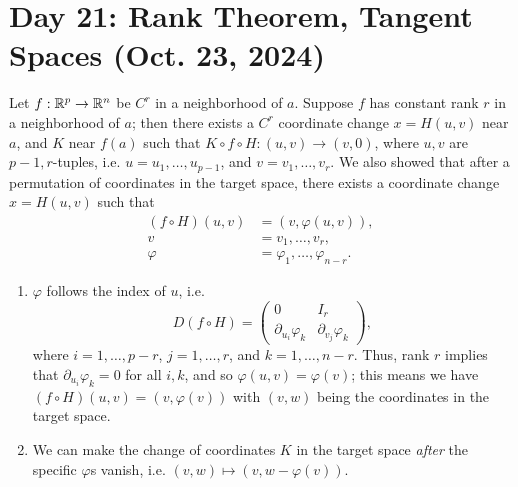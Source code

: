 \section{Day 21: Rank Theorem, Tangent Spaces (Oct. 23, 2024)}
Let $f : \mathbb R^p \to \mathbb R^n$ be $C^r$ in a neighborhood of $a$. Suppose $f$ has constant rank $r$ in a neighborhood of $a$; then there exists a $C^r$ coordinate change $x = H(u, v)$ near $a$, and $K$ near $f(a)$ such that $K \circ f \circ H : (u, v) \to (v, 0)$, where $u, v$ are $p-1, r$-tuples, i.e. $u = u_1, \dots, u_{p-1}$, and $v = v_1, \dots, v_r$. We also showed that after a permutation of coordinates in the target space, there exists a coordinate change $x = H(u, v)$ such that
\begin{align*}
    (f \circ H)(u, v) &= (v, \varphi(u, v)), \\
    v &= v_1, \dots, v_r, \\
    \varphi &= \varphi_1, \dots, \varphi_{n-r}.
\end{align*}
\begin{enumerate}[label=(\alph*)]
    \item $\varphi$ follows the index of $u$, i.e.
    \[ D(f \circ H) = \left(\begin{array}{c|c} 0 & I_r \\ \hline \partial_{u_i} \varphi_k & \partial_{v_j} \varphi_k \end{array}\right), \]
    where $i = 1, \dots, p-r$, $j = 1, \dots, r$, and $k = 1, \dots, n-r$. Thus, rank $r$ implies that $\partial_{u_i} \varphi_k = 0$ for all $i, k$, and so $\varphi(u, v) = \varphi(v)$; this means we have $(f \circ H)(u, v) = (v, \varphi(v))$ with $(v, w)$ being the coordinates in the target space.

    \item We can make the change of coordinates $K$ in the target space \textit{after} the specific $\varphi$s vanish, i.e. $(v, w) \mapsto (v, w - \varphi(v))$.
\end{enumerate}

